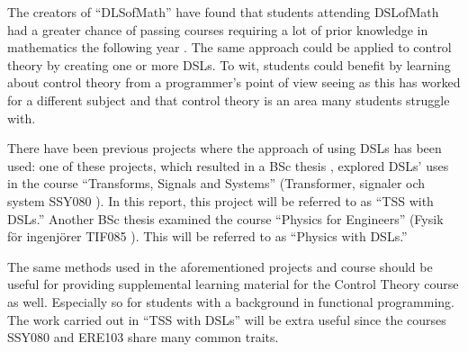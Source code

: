 The creators of ``DLSofMath'' have found that students attending DSLofMath had a greater chance of passing courses requiring a lot of prior knowledge in mathematics the following year \cite{Jansson_2019}. The same approach could be applied to control theory by creating one or more DSLs. To wit, students could benefit by learning about control theory from a programmer’s point of view seeing as this has worked for a different subject and that control theory is an area many students struggle with.

There have been previous projects where the approach of using DSLs has been used: one of these projects, which resulted in a BSc thesis \cite{tssarbete}, explored DSLs' uses in the course ``Transforms, Signals and Systems'' (Transformer, signaler och system SSY080 \cite{SSY080}). In this report, this project will be referred to as ``TSS with DSLs.''
Another BSc thesis \cite{fysikarbete} examined the course ``Physics for Engineers'' (Fysik för ingenjörer TIF085 \cite{TIF085}). This will be referred to as ``Physics with DSLs.''

The same methods used in the aforementioned projects and course should be useful for providing supplemental learning material for the Control Theory course as well. Especially so for students with a background in functional programming. The work carried out in ``TSS with DSLs'' will be extra useful since the courses SSY080 and ERE103 share many common traits.


\iffalse
\section{Terminology}
\subsection{Domain-specific languages} \label{sec:DSLs}
A DSL is a specialised language for a particular domain, in contrast to general purpose languages which are generalised across domains. There are a multitude of DSLs in the world, of which HTML, \LaTeX, and Matlab \cite{mernik_heering_sloane_2005} might be most renowned.


Anteckningar(Slids):

Vad är ämnet/problemet som ska undersökas? 
Varför har ämnet/problemet uppkommit? 
Varför är det ett relevant eller intressant ämne/problem? 
För vem? 
Kan det specifika ämnet/problemet relateras till en mer generell diskussion?
\fi